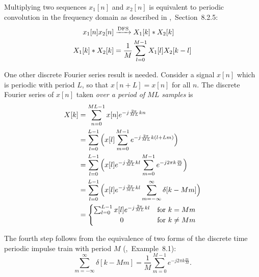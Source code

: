 Multiplying two sequences $x_1[n]$ and $x_2[n]$ is equivalent to periodic convolution in the frequency domain %
as described in \cite{DTSP},~Section~8.2.5: 
\begin{equation}
  \begin{aligned}
    x_1[n] x_2[n] & \xrightarrow{\rm DFS} X_1[k] \ast X_2[k] \\
    X_1[k] \ast X_2[k] & = \frac{1}{M} \sum_{l=0}^{M-1} X_1[l]X_2[k-l]
  \end{aligned}
\end{equation}


One other discrete Fourier series result is needed. Consider a signal $x[n]$ which is periodic with period $L$, so that $x[n+L] = x[n]$ for all $n$. The discrete Fourier series of $x[n]$ taken \textit{over a period of $ML$ samples} is
\begin{equation}
  \label{eqn:periodic_dfs}
  \begin{aligned}
    X[k] &= \sum_{n=0}^{ML-1} x[n] e^{-j \frac{2\pi}{ML} kn} \\
    &= \sum_{l=0}^{L-1} \Big(x[l] \sum_{m=0}^{M-1} e^{-j \frac{2\pi}{ML} k (l + Lm)}\Big) \\
    &= \sum_{l=0}^{L-1} \Big(x[l] e^{-j \frac{2\pi}{ML}{kl}} \sum_{m=0}^{M-1} e^{-j 2\pi k \frac{m}{M}}\Big) \\
    &= \sum_{l=0}^{L-1} \Big(x[l] e^{-j \frac{2\pi}{ML}{kl}} \sum_{m=-\infty}^{\infty} \delta[k-Mm]\Big) \\
    &= \left\{
    \def\arraystretch{1.2}%
    \begin{array}{@{}c@{\quad}l@{}}
      \sum_{l=0}^{L-1} x[l] e^{-j \frac{2\pi}{ML}{kl}} & \text{for $k = Mm$}\\
      0 & \text{for $k \neq Mm$}\\
    \end{array}\right.
  \end{aligned}
\end{equation}

The fourth step follows from the equivalence of two forms of the discrete time periodic impulse train with period $M$ (\cite{DTSP},~Example~8.1):
\begin{equation}
  \label{eqn:impulse_train}
  \sum_{m=-\infty}^{\infty} \delta[k-Mm] = \frac{1}{M} \sum_{m=0}^{M-1} e^{-j 2\pi k \frac{m}{M}}. 
\end{equation}
